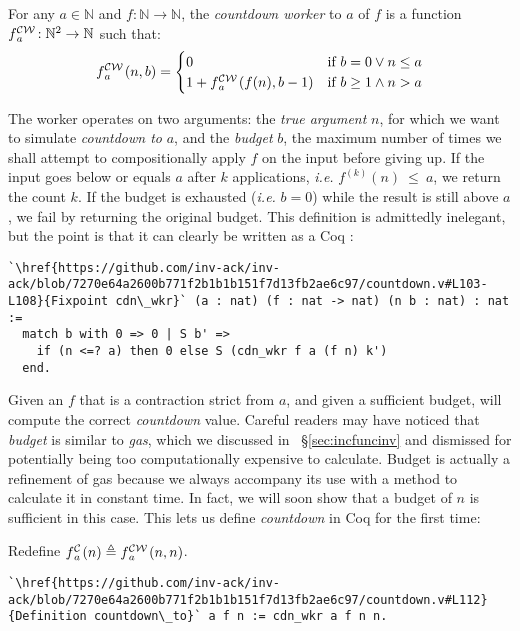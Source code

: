 \begin{defn} \label{defn: countdown-worker} \label{lem: cdt-init}
For any $a\in \mathbb{N}$ and $f: \mathbb{N}\to \mathbb{N}$, the
\emph{countdown worker}
to $a$ of $f$ is a function $\cdw{f}{a}\ : \mathbb{N}^2\to \mathbb{N}$ such that:
\begin{equation*}
\cdw{f}{a}(n, b) = \begin{cases}
0 & \text{if } b = 0 \vee n\le a \\ 1 +\cdw{f}{a}(f(n), b-1) & \text{if } b \ge 1 \wedge n > a
\end{cases}
\end{equation*}
\end{defn}
The worker operates on two arguments:
the \emph{true argument} $n$, for which we want to simulate
\emph{countdown to} $a$,
and the \emph{budget} $b$, the maximum number of times we shall attempt
to compositionally apply $f$ on the input before giving up.
If the input goes below or equals $a$ after $k$ applications, \emph{i.e.} $f^{(k)}(n)~\le~a$, we return the count $k$. If the budget is exhausted (\emph{i.e.} $b = 0$) while the result is still above $a$, we fail by returning the original budget. This definition is admittedly inelegant, but the point is that it can clearly be written as a Coq :
\begin{lstlisting}
`\href{https://github.com/inv-ack/inv-ack/blob/7270e64a2600b771f2b1b1b151f7d13fb2ae6c97/countdown.v#L103-L108}{Fixpoint cdn\_wkr}` (a : nat) (f : nat -> nat) (n b : nat) : nat :=
  match b with 0 => 0 | S b' =>
    if (n <=? a) then 0 else S (cdn_wkr f a (f n) k')
  end.
\end{lstlisting}
Given an $f$ that is a contraction strict from $a$,
and given a sufficient budget, 
will compute the correct \emph{countdown} value.
Careful readers may have noticed that \emph{budget} is similar to
\emph{gas}, which we discussed in ~\S\ref{sec:incfuncinv}
and dismissed for potentially
being too computationally expensive to calculate.
Budget is actually a refinement of gas because
we always accompany its use with a method to calculate it in constant time.
In fact, we will soon show that a budget of $n$ is sufficient in this case.
This lets us define \emph{countdown} in Coq for the first time:
\begin{defn} \label{defn: countdown}
Redefine $\cdt{f}{a}(n)
\triangleq \cdw{f}{a}(n, n)$.
\begin{lstlisting}
`\href{https://github.com/inv-ack/inv-ack/blob/7270e64a2600b771f2b1b1b151f7d13fb2ae6c97/countdown.v#L112}{Definition countdown\_to}` a f n := cdn_wkr a f n n.
\end{lstlisting}
\vspace{-0.8em}
\end{defn}
